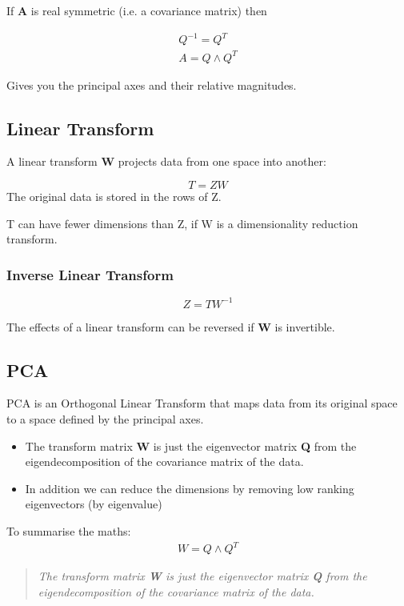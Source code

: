 If \textbf{A} is real symmetric (i.e. a covariance matrix) then 

\begin{align}
    Q^{-1} = Q^{T} \\
    A = Q \land Q^{T}
\end{align}

Gives you the principal axes and their relative magnitudes.

\subsection{Linear Transform}
A linear transform \textbf{W} projects data from one space into another:

\begin{equation}
    T = ZW
\end{equation}
The original data is stored in the rows of Z.

T can have fewer dimensions than Z, if W is a dimensionality reduction transform.

\subsubsection{Inverse Linear Transform}

\begin{equation}
    Z = TW^{-1}
\end{equation}

The effects of a linear transform can be reversed if \textbf{W} is invertible.

\subsection{PCA}
PCA is an Orthogonal Linear Transform that maps data from its original space to a space defined by the principal axes.
\begin{itemize}
    \item The transform matrix \textbf{W} is just the eigenvector matrix \textbf{Q} from the eigendecomposition of the covariance matrix of the data.
    \item In addition we can reduce the dimensions by removing low ranking eigenvectors (by eigenvalue)
\end{itemize}

To summarise the maths:
\begin{align}
    W = Q \land Q^{T}
\end{align}

\begin{quote}
    \textit{The transform matrix \textbf{W} is just the eigenvector matrix \textbf{Q} from the eigendecomposition of the covariance matrix of the data.}
\end{quote}

